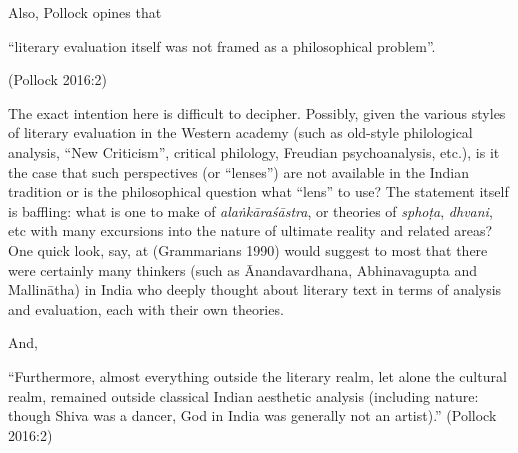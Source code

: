 \newpage

Also, Pollock opines that 

\begin{myquote}
“literary evaluation itself was not framed as a philosophical problem”. 

\hfill (Pollock 2016:2) 
\end{myquote}

The exact intention here is difficult to decipher. Possibly, given the various styles of literary evaluation in the Western academy (such as old-style philological analysis, “New Criticism”, critical philology, Freudian psychoanalysis, etc.), is it the case that such perspectives (or “lenses”) are not available in the Indian tradition or is the philosophical question what “lens” to use? The statement itself is baffling: what is one to make of \textsl{alaṅkāraśāstra}, or theories of \textsl{sphoṭa}, \textsl{dhvani}, etc with many excursions into the nature of ultimate reality and related areas? One quick look, say, at (Grammarians 1990) would suggest to most that there were certainly many thinkers (such as Ānandavardhana, Abhinavagupta and Mallinātha) in India who deeply thought about literary text in terms of analysis and evaluation, each with their own theories.

And, 

\begin{myquote}
“Furthermore, almost everything outside the literary realm, let alone the cultural realm, remained outside classical Indian aesthetic analysis (including nature: though Shiva was a dancer, God in India was generally not an artist).” \hfill (Pollock 2016:2)
\end{myquote}

